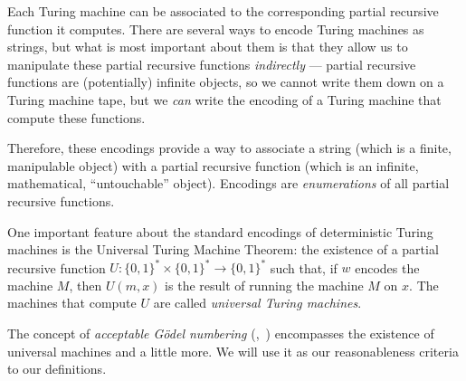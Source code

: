 \documentclass[12pt]{article}
\theoremstyle{definition}
\begin{document}
Each Turing machine can be associated
to the corresponding partial recursive function it computes.
There are several ways to encode Turing machines as strings,
but what is most important about them is that they allow us
to manipulate these partial recursive functions \emph{indirectly}
--- partial recursive functions are (potentially) infinite objects,
so we cannot write them down on a Turing machine tape,
but we \emph{can} write the encoding of a Turing machine that compute these functions.

Therefore,
these encodings provide a way to associate a string
(which is a finite, manipulable object)
with a partial recursive function
(which is an infinite, mathematical, ``untouchable'' object).
Encodings are \emph{enumerations} of all partial recursive functions.

One important feature about the standard encodings of deterministic Turing machines
is the Universal Turing Machine Theorem:
the existence of a partial recursive function
$U: \{0, 1\}^* \times \{0, 1\}^* \to \{0, 1\}^*$
such that, if $w$ encodes the machine $M$,
then $U(m, x)$ is the result of running the machine $M$ on $x$.
The machines that compute $U$ are called \emph{universal Turing machines}.

The concept of \emph{acceptable Gödel numbering}
(\cite[p.~41]{Rogers1987},~\cite[p.~324]{Blum1967})
encompasses the existence of universal machines and a little more.
We will use it as our reasonableness criteria to our definitions.
\end{document}
